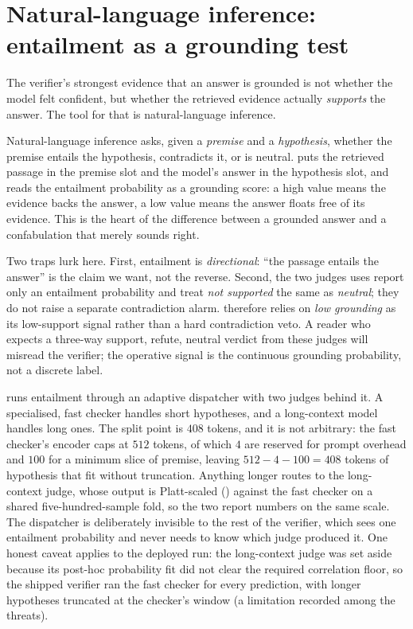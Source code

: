 \section{Natural-language inference: entailment as a grounding test}
\label{sec:prereq-nli}

The verifier's strongest evidence that an answer is grounded is not whether the
model felt confident, but whether the retrieved evidence actually \emph{supports}
the answer. The tool for that is natural-language inference.

Natural-language inference asks, given a \emph{premise} and a \emph{hypothesis},
whether the premise entails the hypothesis, contradicts it, or is neutral. \caem{}
puts the retrieved passage in the premise slot and the model's answer in the
hypothesis slot, and reads the entailment probability as a grounding score: a high
value means the evidence backs the answer, a low value means the answer floats free
of its evidence. This is the heart of the difference between a grounded answer and
a confabulation that merely sounds right.

\begin{pitfall}
Two traps lurk here. First, entailment is \emph{directional}: ``the passage entails
the answer'' is the claim we want, not the reverse. Second, the two judges \caem{}
uses report only an entailment probability and treat \emph{not supported} the same
as \emph{neutral}; they do not raise a separate contradiction alarm. \caem{}
therefore relies on \emph{low grounding} as its low-support signal rather than a
hard contradiction veto. A reader who expects a three-way support, refute, neutral
verdict from these judges will misread the verifier; the operative signal is the
continuous grounding probability, not a discrete label.
\end{pitfall}

\begin{fromcode}
\caem{} runs entailment through an adaptive dispatcher with two judges behind it.
A specialised, fast checker handles short hypotheses, and a long-context model
handles long ones. The split point is $408$ tokens, and it is not arbitrary: the
fast checker's encoder caps at $512$ tokens, of which $4$ are reserved for prompt
overhead and $100$ for a minimum slice of premise, leaving $512 - 4 - 100 = 408$
tokens of hypothesis that fit without truncation. Anything longer routes to the
long-context judge, whose output is Platt-scaled ()
against the fast checker on a shared five-hundred-sample fold, so the two report
numbers on the same scale. The dispatcher is deliberately invisible to the rest of
the verifier, which sees one entailment probability and never needs to know which
judge produced it. One honest caveat applies to the deployed run: the long-context
judge was set aside because its post-hoc probability fit did not clear the required
correlation floor, so the shipped verifier ran the fast checker for every
prediction, with longer hypotheses truncated at the checker's window (a limitation
recorded among the threats).
\end{fromcode}

